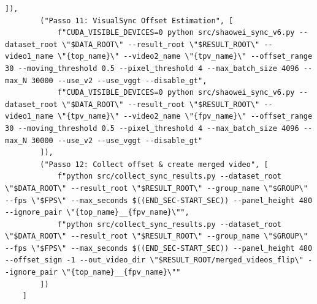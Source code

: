 \begin{lstlisting}[style=pythonstyle, caption={Definizione della pipeline di elaborazione}, label={lst:pipeline_steps}]
        ]),
        ("Passo 11: VisualSync Offset Estimation", [
            f"CUDA_VISIBLE_DEVICES=0 python src/shaowei_sync_v6.py --dataset_root \"$DATA_ROOT\" --result_root \"$RESULT_ROOT\" --video1_name \"{top_name}\" --video2_name \"{tpv_name}\" --offset_range 30 --moving_threshold 0.5 --pixel_threshold 4 --max_batch_size 4096 --max_N 30000 --use_v2 --use_vggt --disable_gt",
            f"CUDA_VISIBLE_DEVICES=0 python src/shaowei_sync_v6.py --dataset_root \"$DATA_ROOT\" --result_root \"$RESULT_ROOT\" --video1_name \"{tpv_name}\" --video2_name \"{fpv_name}\" --offset_range 30 --moving_threshold 0.5 --pixel_threshold 4 --max_batch_size 4096 --max_N 30000 --use_v2 --use_vggt --disable_gt"
        ]),
        ("Passo 12: Collect offset & create merged video", [
            f"python src/collect_sync_results.py --dataset_root \"$DATA_ROOT\" --result_root \"$RESULT_ROOT\" --group_name \"$GROUP\" --fps \"$FPS\" --max_seconds $((END_SEC-START_SEC)) --panel_height 480 --ignore_pair \"{top_name}__{fpv_name}\"",
            f"python src/collect_sync_results.py --dataset_root \"$DATA_ROOT\" --result_root \"$RESULT_ROOT\" --group_name \"$GROUP\" --fps \"$FPS\" --max_seconds $((END_SEC-START_SEC)) --panel_height 480 --offset_sign -1 --out_video_dir \"$RESULT_ROOT/merged_videos_flip\" --ignore_pair \"{top_name}__{fpv_name}\""
        ])
    ]
\end{lstlisting}

